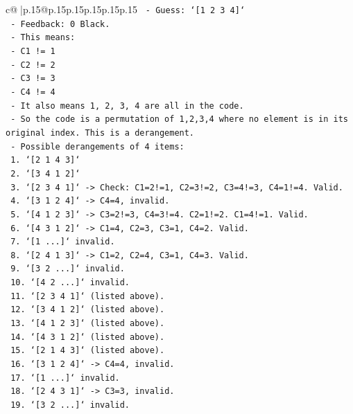 \documentclass{article}
\begin{document}
{\begin{supertabular}{c@{$\;$}|p{.15\linewidth}@{}p{.15\linewidth}p{.15\linewidth}p{.15\linewidth}p{.15\linewidth}p{.15\linewidth}}
{{{\texttt{  {-} Guess: `{[}1 2 3 4{]}`} \\
\texttt{  {-} Feedback: 0 Black.} \\
\texttt{  {-} This means:} \\
\texttt{    {-} C1 != 1} \\
\texttt{    {-} C2 != 2} \\
\texttt{    {-} C3 != 3} \\
\texttt{    {-} C4 != 4} \\
\texttt{  {-} It also means 1, 2, 3, 4 are all in the code.} \\
\texttt{  {-} So the code is a permutation of 1,2,3,4 where no element is in its original index. This is a derangement.} \\
\texttt{  {-} Possible derangements of 4 items:} \\
\texttt{    1. `{[}2 1 4 3{]}`} \\
\texttt{    2. `{[}3 4 1 2{]}`} \\
\texttt{    3. `{[}2 3 4 1{]}` {-}> Check: C1=2!=1, C2=3!=2, C3=4!=3, C4=1!=4. Valid.} \\
\texttt{    4. `{[}3 1 2 4{]}` {-}> C4=4, invalid.} \\
\texttt{    5. `{[}4 1 2 3{]}` {-}> C3=2!=3, C4=3!=4. C2=1!=2. C1=4!=1. Valid.} \\
\texttt{    6. `{[}4 3 1 2{]}` {-}> C1=4, C2=3, C3=1, C4=2. Valid.} \\
\texttt{    7. `{[}1 ...{]}` invalid.} \\
\texttt{    8. `{[}2 4 1 3{]}` {-}> C1=2, C2=4, C3=1, C4=3. Valid.} \\
\texttt{    9. `{[}3 2 ...{]}` invalid.} \\
\texttt{    10. `{[}4 2 ...{]}` invalid.} \\
\texttt{    11. `{[}2 3 4 1{]}` (listed above).} \\
\texttt{    12. `{[}3 4 1 2{]}` (listed above).} \\
\texttt{    13. `{[}4 1 2 3{]}` (listed above).} \\
\texttt{    14. `{[}4 3 1 2{]}` (listed above).} \\
\texttt{    15. `{[}2 1 4 3{]}` (listed above).} \\
\texttt{    16. `{[}3 1 2 4{]}` {-}> C4=4, invalid.} \\
\texttt{    17. `{[}1 ...{]}` invalid.} \\
\texttt{    18. `{[}2 4 3 1{]}` {-}> C3=3, invalid.} \\
\texttt{    19. `{[}3 2 ...{]}` invalid.} \\
}}}
\end{supertabular}}
\end{document}

